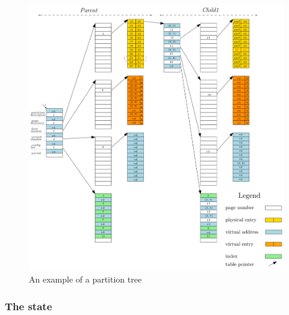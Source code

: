 \vfill 

\begin{figure}[!ht]  
	\centering 
	\includegraphics[width=1\linewidth, height=0.6\textheight, frame]{img/memoryEx.png} 
	\caption{An example of a partition tree}
	\label{partitionEx}
\end{figure}

\subsubsection{The state}
 
